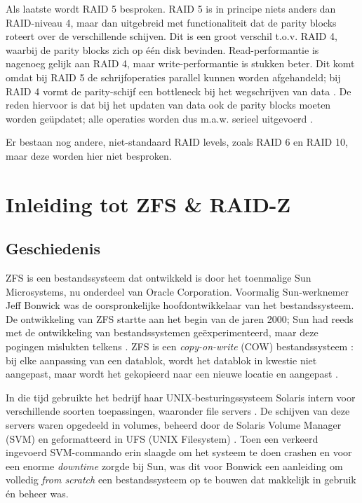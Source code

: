 Als laatste wordt RAID 5 besproken. RAID 5 is in principe niets anders dan RAID-niveau 4, maar dan uitgebreid met functionaliteit dat de \gls{parity} blocks roteert over de verschillende schijven. Dit is een groot verschil t.o.v. RAID 4, waarbij de \gls{parity} blocks zich op één disk bevinden. Read-performantie is nagenoeg gelijk aan RAID 4, maar write-performantie is stukken beter. Dit komt omdat bij RAID 5 de schrijfoperaties parallel kunnen worden afgehandeld; bij RAID 4 vormt de parity-schijf een \gls{bottleneck} bij het wegschrijven van data \autocite{Chen1994}. De reden hiervoor is dat bij het updaten van data ook de \gls{parity} blocks moeten worden geüpdatet; alle operaties worden dus m.a.w. serieel uitgevoerd \autocite{OSThreePiecesRemzi2015}.

Er bestaan nog andere, niet-standaard RAID levels, zoals RAID 6 en RAID 10, maar deze worden hier niet besproken.

\section{Inleiding tot ZFS \& RAID-Z}

\subsection{Geschiedenis}

ZFS is een bestandssysteem dat ontwikkeld is door het toenmalige Sun Microsystems, nu onderdeel van Oracle Corporation. Voormalig Sun-werknemer Jeff Bonwick was de oorspronkelijke hoofdontwikkelaar van het bestandssysteem. De ontwikkeling van ZFS startte aan het begin van de jaren 2000; Sun had reeds met de ontwikkeling van bestandssystemen geëxperimenteerd, maar deze pogingen mislukten telkens \autocite{Bonwick2015}. ZFS is een \textit{copy-on-write} (COW) bestandssysteem \autocite{BrianHickmann2007}: bij elke aanpassing van een datablok, wordt het datablok in kwestie niet aangepast, maar wordt het gekopieerd naar een nieuwe locatie en aangepast \autocite{Lucas2015}.

In die tijd gebruikte het bedrijf haar UNIX-besturingssysteem Solaris intern voor verschillende soorten toepassingen, waaronder file servers \autocite{Bonwick2015}. De schijven van deze servers waren opgedeeld in volumes, beheerd door de Solaris Volume Manager (SVM) en geformatteerd in UFS (UNIX Filesystem) \autocite{Bonwick2015}. Toen een verkeerd ingevoerd SVM-commando erin slaagde om het systeem te doen crashen en voor een enorme \textit{downtime} zorgde bij  Sun, was dit voor Bonwick een aanleiding om volledig \textit{from scratch} een bestandssysteem op te bouwen dat makkelijk in gebruik én beheer was.

